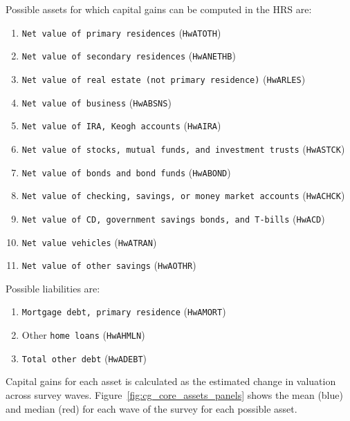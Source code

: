 \par Possible assets for which capital gains can be computed in the HRS are:
\begin{enumerate}
  \item \texttt{Net value of primary residences} (\texttt{HwATOTH})
  \item \texttt{Net value of secondary residences} (\texttt{HwANETHB})
  \item \texttt{Net value of real estate (not primary residence)} (\texttt{HwARLES})
  \item \texttt{Net value of business} (\texttt{HwABSNS})
  \item \texttt{Net value of IRA, Keogh accounts} (\texttt{HwAIRA})
  \item \texttt{Net value of stocks, mutual funds, and investment trusts} (\texttt{HwASTCK})
  \item \texttt{Net value of bonds and bond funds} (\texttt{HwABOND})
  \item \texttt{Net value of checking, savings, or money market accounts} (\texttt{HwACHCK})
  \item \texttt{Net value of CD, government savings bonds, and T-bills} (\texttt{HwACD})
  \item \texttt{Net value vehicles} (\texttt{HwATRAN})
  \item \texttt{Net value of other savings} (\texttt{HwAOTHR})
\end{enumerate}

\par Possible liabilities are:
\begin{enumerate}
  \item \texttt{Mortgage debt, primary residence} (\texttt{HwAMORT})
  \item Other \texttt{home loans} (\texttt{HwAHMLN})
  \item \texttt{Total other debt} (\texttt{HwADEBT})
\end{enumerate}

\par Capital gains for each asset is calculated as the estimated change in valuation across survey waves. Figure~\ref{fig:cg_core_assets_panels} shows the mean (blue) and median (red) for each wave of the survey for each possible asset.  

